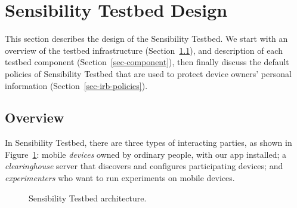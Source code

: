 \section{Sensibility Testbed Design}\label{sec-design}

This section describes the design of the Sensibility Testbed. 
We start with
an overview of the testbed infrastructure (Section~\ref{sec-overview}), 
and description of each testbed component 
(Section~\ref{sec-component}), then finally discuss the default policies 
of Sensibility Testbed that are used to protect device owners' personal 
information (Section~\ref{sec-irb-policies}).


\subsection{Overview}\label{sec-overview}

In Sensibility Testbed, there are three types of interacting
parties, as shown in Figure~\ref{fig-arch}: mobile \textit{devices} 
owned by ordinary people, with our app installed; a 
\textit{clearinghouse} server that discovers and configures
participating devices; and \textit{experimenters} who want to run
experiments on mobile devices. 

\begin{figure}
\caption{\small Sensibility Testbed architecture. \label{fig-arch}}
\end{figure}

